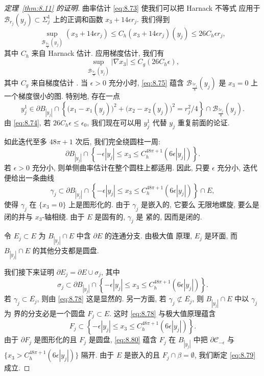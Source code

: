 \begin{proof}[定理~\ref{thm:8.11} 的证明]
曲率估计 \eqref{eq:8.73} 使我们可以把 Harnack 不等式 \cite{CgYa} 应用于
$\mathcal{B}_{r_j}(y_j)\subset\Sigma_j^1$ 上的正调和函数
$x_3+14\epsilon r_j$. 我们得到
\begin{equation}
\sup_{\mathcal{B}_{\frac{3r_j}{4}}(y_j)}(x_3+14\epsilon r_j)
\leq C_h(x_3+14\epsilon r_j)(y_j)\leq26C_h\epsilon r_j,
\label{eq:8.74}
\end{equation}
其中 $C_h$ 来自 Harnack 估计. 应用梯度估计, 我们有
\begin{equation}
\sup_{\mathcal{B}_{\frac{5r_j}{8}}(y_j)}|\nabla x_3|
\leq C_g(26C_h\epsilon),
\label{eq:8.75}
\end{equation}
其中 $C_g$ 来自梯度估计 \cite{CgYa}. 当 $\epsilon>0$ 充分小时, \eqref{eq:8.75}
蕴含 $\mathcal{B}_{\frac{5r_j}{8}}(y_j)$ 是 $x_3=0$ 上一个梯度很小的图.
特别地, 存在一点
\begin{equation}
y_j^1\in\partial B_{|y_j|}\cap
\left\{\bigl(x_1-x_1(y_j)\bigr)^2+\bigl(x_2-x_2(y_j)\bigr)^2=r_j^2/4
\right\}\cap\mathcal{B}_{\frac{5r_j}{8}}(y_j).
\label{eq:8.76}
\end{equation}
由 \eqref{eq:8.74}, 若 $26C_h\epsilon\leq\epsilon_0$, 我们现在可以用 $y_j^1$
代替 $y_j$ 重复前面的论证.

如此迭代至多 $48\pi+1$ 次后, 我们完全绕圆柱一周:
\begin{equation}
\partial B_{|y_j|}\cap
\left\{-\epsilon|y_j|\leq x_3\leq C_h^{48\pi+1}(6\epsilon|y_j|)\right\}.
\label{eq:8.77}
\end{equation}
若 $\epsilon>0$ 充分小, 则单侧曲率估计在整个圆柱上都适用. 因此, 只要
$\epsilon$ 充分小, 迭代便给出一条曲线
\begin{equation}
\gamma_j\subset\partial B_{|y_j|}\cap
\left\{-\epsilon|y_j|\leq x_3\leq C_h^{48\pi+1}(6\epsilon|y_j|)\right\}\cap E,
\label{eq:8.78}
\end{equation}
使得 $\gamma_j$ 在 $\{x_3=0\}$ 上是图形化的. 由于 $\gamma_j$ 是嵌入的, 它要么
无限地螺旋, 要么是闭的并与 $x_3$-轴相绕. 由于 $E$ 是固有的, $\gamma_j$ 是
紧的, 因而是闭的.

令 $E_j\subset E$ 为 $B_{|y_j|}\cap E$ 中含 $\partial E$ 的连通分支. 由极大值
原理, $E_j$ 是环面, 而 $B_{|y_j|}\cap E$ 的其他分支都是圆盘.

我们接下来证明 $\partial E_j=\partial E\cup\sigma_j$, 其中
\begin{equation}
\sigma_j\subset\partial B_{|y_j|}\cap
\left\{-\epsilon|y_j|\leq x_3\leq C_h^{48\pi+1}(6\epsilon|y_j|)\right\}.
\label{eq:8.79}
\end{equation}
若 $\gamma_j\subset\overline{E_j}$, 则由 \eqref{eq:8.78} 这是显然的. 另一方面,
若 $\gamma_j\not\subset\overline{E_j}$, 则 $B_{|y_j|}\cap E$ 中以 $\gamma_j$ 为
界的分支必是一个圆盘 $F_j\subset E$. 这时 \eqref{eq:8.78} 与极大值原理蕴含
\begin{equation}
F_j\subset
\left\{-\epsilon|y_j|\leq x_3\leq C_h^{48\pi+1}(6\epsilon|y_j|)\right\}.
\label{eq:8.80}
\end{equation}
由于 $\partial F_j$ 是图形化的且 $F_j$ 是圆盘, \eqref{eq:8.80} 蕴含 $F_j$ 在
$B_{|y_j|}$ 中把 $\partial\mathcal{C}_{-\epsilon}$ 与
$\{x_3>C_h^{48\pi+1}(6\epsilon|y_j|)\}$ 隔开. 由于 $E$ 是嵌入的且
$F_j\cap\beta=\emptyset$, 我们断定 \eqref{eq:8.79} 成立.


\end{proof}
